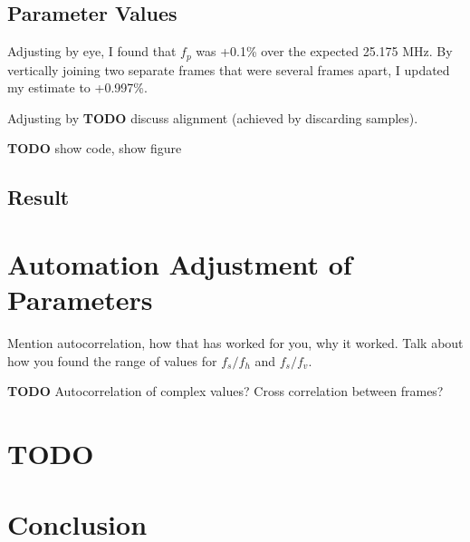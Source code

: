 \documentclass{article}
\newcommand*{\TODO}{\textbf{TODO}\xspace}
\begin{document}
\subsection*{Parameter Values}

Adjusting by eye, I found that $f_p$ was +0.1\% over the expected 25.175 MHz. By vertically joining two separate frames that were several frames apart, I updated my estimate to +0.997\%.

Adjusting by \TODO discuss alignment (achieved by discarding samples).

\textbf{TODO} show code, show figure

\subsection*{Result}

\section*{Automation Adjustment of Parameters}

Mention autocorrelation, how that has worked for you, why it worked.
Talk about how you found the range of values for $f_s / f_h$ and $f_s / f_v$.

\textbf{TODO} Autocorrelation of complex values? Cross correlation between frames?

\section*{TODO}

\section*{Conclusion}

\newpage
\appendix

\newpage


\end{document}
